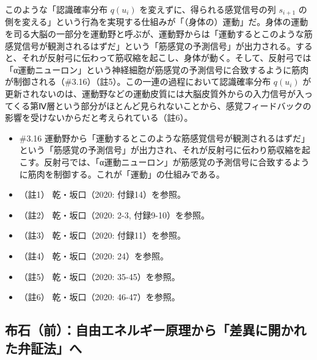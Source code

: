 このような「認識確率分布 \(q(u_i)\) を変えずに、得られる感覚信号の列
\(s_{i+1}\)
の側を変える」という行為を実現する仕組みが「（身体の）運動」だ。身体の運動を司る大脳の一部分を運動野と呼ぶが、運動野からは「運動するとこのような筋感覚信号が観測されるはずだ」という「筋感覚の予測信号」が出力される。すると、それが反射弓に伝わって筋収縮を起こし、身体が動く。そして、反射弓では「α運動ニューロン」という神経細胞が筋感覚の予測信号に合致するように筋肉が制御される（\#3.16）（註5）。この一連の過程において認識確率分布
\(q(u_i)\)
が更新されないのは、運動野などの運動皮質には大脳皮質外からの入力信号が入ってくる第Ⅳ層という部分がほとんど見られないことから、感覚フィードバックの影響を受けないからだと考えられている（註6）。

\begin{note}{}
  \begin{itemize}
    \tightlist
    \item{\#3.16}
      運動野から「運動するとこのような筋感覚信号が観測されるはずだ」という「筋感覚の予測信号」が出力され、それが反射弓に伝わり筋収縮を起こす。反射弓では、「α運動ニューロン」が筋感覚の予測信号に合致するように筋肉を制御する。これが「運動」の仕組みである。
  \end{itemize}
\end{note}

\begin{itemize}
\tightlist
\item
  （註1） 乾・坂口（2020: 付録14）\cite{InuiAndSakaguchi}を参照。
\item
  （註2） 乾・坂口（2020: 2-3, 付録9-10）\cite{InuiAndSakaguchi}を参照。
\item
  （註3） 乾・坂口（2020: 付録11）\cite{InuiAndSakaguchi}を参照。
\item
  （註4） 乾・坂口（2020: 24）\cite{InuiAndSakaguchi}を参照。
\item
  （註5） 乾・坂口（2020: 35-45）\cite{InuiAndSakaguchi}を参照。
\item
  （註6） 乾・坂口（2020: 46-47）\cite{InuiAndSakaguchi}を参照。
\end{itemize}

\subsection{布石（前）：自由エネルギー原理から「差異に開かれた弁証法」へ}\label{ux5e03ux77f3ux524dux81eaux7531ux30a8ux30cdux30ebux30aeux30fcux539fux7406ux304bux3089ux5deeux7570ux306bux958bux304bux308cux305fux5f01ux8a3cux6cd5ux3078}

